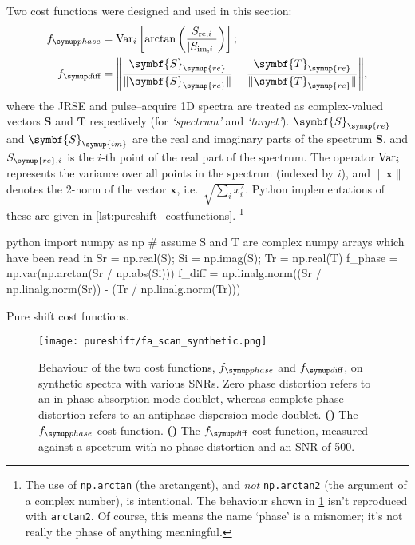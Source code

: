 Two cost functions were designed and used in this section:
\begin{align}
    \fphase &= \Var_i\left[\arctan\left(\frac{S_{\text{re},i}}{|S_{\text{im},i}|}\right)\right]; \label{eq:ps_cf_phase} \\
    \fdiff &= \Biggl\lVert \frac{\symbf{S}_{\symup{re}}}{\lVert \symbf{S}_{\symup{re}} \rVert} - \frac{\symbf{T}_{\symup{re}}}{\lVert \symbf{T}_{\symup{re}} \rVert} \Biggr\rVert, \label{eq:ps_cf_diff}
\end{align}
where the JRSE and pulse--acquire 1D spectra are treated as complex-valued vectors $\symbf{S}$ and $\symbf{T}$ respectively (for \textit{`spectrum'} and \textit{`target'}). $\symbf{S}_{\symup{re}}$ and $\symbf{S}_{\symup{im}}$ are the real and imaginary parts of the spectrum $\symbf{S}$, and $S_{\symup{re},i}$ is the $i$-th point of the real part of the spectrum.
The operator $\operatorname{Var}_i$ represents the variance over all points in the spectrum (indexed by $i$), and $\lVert \symbf{x} \rVert$ denotes the 2-norm of the vector $\symbf{x}$, i.e.\ $\sqrt{\sum_i x_i^2}$.
Python implementations of these are given in \cref{lst:pureshift_costfunctions}.%
\footnote{The use of \texttt{np.arctan} (the arctangent), and \textit{not} \texttt{np.arctan2} (the argument of a complex number), is intentional. The behaviour shown in \cref{fig:fa_scan_synthetic} isn't reproduced with \texttt{arctan2}. Of course, this means the name `phase' is a misnomer; it's not really the phase of anything meaningful.}

\begin{mylisting}[htb]
\begin{tcbminted}{python}
import numpy as np
# assume S and T are complex numpy arrays which have been read in
Sr = np.real(S); Si = np.imag(S); Tr = np.real(T)
f_phase = np.var(np.arctan(Sr / np.abs(Si)))
f_diff = np.linalg.norm((Sr / np.linalg.norm(Sr))
                        - (Tr / np.linalg.norm(Tr)))
\end{tcbminted}
    \caption[Pure shift cost functions]{Pure shift cost functions.}
    \label{lst:pureshift_costfunctions}
\end{mylisting}

\begin{figure}[htb]
    \centering
    \texttt{[image: pureshift/fa\_scan\_synthetic.png]}%
    {\label{fig:fa_scan_synthetic_fphase}}%
    {\label{fig:fa_scan_synthetic_fdiff}}%
    \caption[Evaluation of $\fphase$ and $\fdiff$ cost functions on synthetic data]{
        Behaviour of the two cost functions, $\fphase$ and $\fdiff$, on synthetic spectra with various SNRs.
        Zero phase distortion refers to an in-phase absorption-mode doublet, whereas complete phase distortion refers to an antiphase dispersion-mode doublet.
        \textbf{()} The $\fphase$ cost function.
        \textbf{()} The $\fdiff$ cost function, measured against a spectrum with no phase distortion and an SNR of 500.
    }
    \label{fig:fa_scan_synthetic}
\end{figure}

